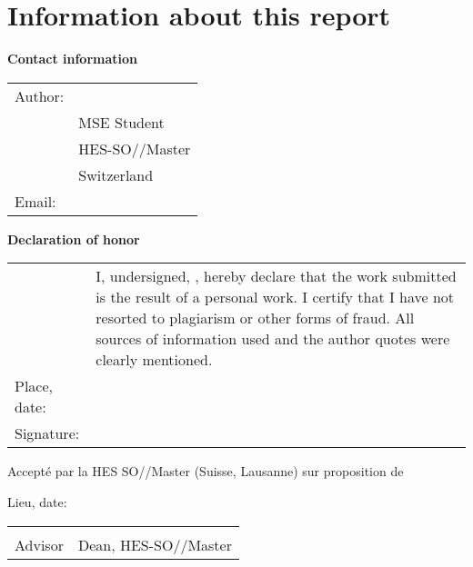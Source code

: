 \chapter*{Information about this report}

\vspace{\fill}

\textbf{Contact information}

\begin{tabularx}{\textwidth}{N{2.5cm}X}
	Author:	 & \AuthorFirstName \AuthorLastName \\
	& MSE Student \\
	& HES-SO//Master \\
	& Switzerland \\
	Email: & \email{\AuthorEmail}
\end{tabularx}

\vspace{\fill}

\textbf{Declaration of honor}

{\renewcommand{\arraystretch}{2}
\begin{tabularx}{\textwidth}{N{2.5cm}X}
	& I, undersigned, \Author, hereby declare that the work submitted is 
	the result of a personal work. I certify that I have not resorted to 
	plagiarism or other forms of fraud. All sources of information used and the 
	author quotes were clearly mentioned. \\
	Place, date: & \underline{\hspace{7cm}} \\ 
	Signature: & \underline{\hspace{7cm}}
\end{tabularx}
}

\vspace{\fill}


Accepté par la HES SO//Master (Suisse, Lausanne) sur proposition de

\vspace{0.5cm}

\Advisor %


\vspace{1cm}

Lieu, date: \underline{\hspace{8cm}}

\vspace{3cm}

{ \renewcommand{\arraystretch}{1.5}
\begin{tabularx}{\textwidth}{X X}
	\Advisor  & \Dean\\ 
	Advisor   & Dean, HES-SO//Master\\
\end{tabularx}
}